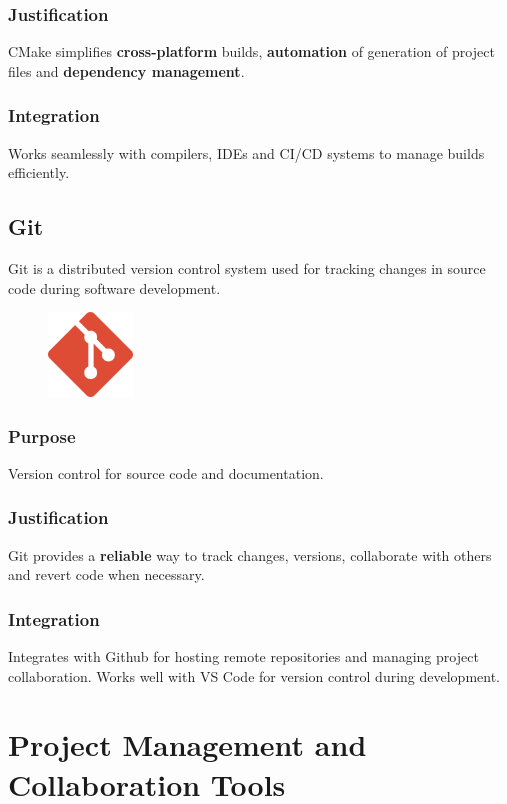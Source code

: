 \documentclass[a4paper, 11pt]{article}
\begin{document}
\subsubsection{Justification}
CMake simplifies \textbf{cross-platform} builds, \textbf{automation} of generation of project files and \textbf{dependency management}.

\subsubsection{Integration}
Works seamlessly with compilers, IDEs and CI/CD systems to manage builds efficiently.

\subsection{Git}
Git is a distributed version control system used for tracking changes in source code during software development.

\begin{figure}[h]
    \centering
    \includegraphics[width=0.2\textwidth]{git.png}
\end{figure}

\subsubsection{Purpose}
Version control for source code and documentation.

\subsubsection{Justification}
Git provides a \textbf{reliable} way to track changes, versions, collaborate with others and revert code when necessary.

\subsubsection{Integration}
Integrates with Github for hosting remote repositories and managing project collaboration. Works well with VS Code for version control during development.

\newpage\section{Project Management and Collaboration Tools}
\end{document}
